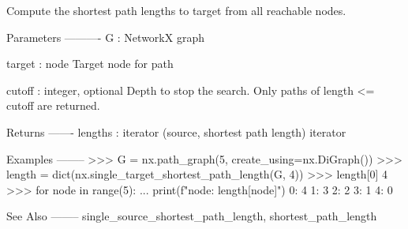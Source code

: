 \begin{DoxyVerb}Compute the shortest path lengths to target from all reachable nodes.

Parameters
----------
G : NetworkX graph

target : node
   Target node for path

cutoff : integer, optional
    Depth to stop the search. Only paths of length <= cutoff are returned.

Returns
-------
lengths : iterator
    (source, shortest path length) iterator

Examples
--------
>>> G = nx.path_graph(5, create_using=nx.DiGraph())
>>> length = dict(nx.single_target_shortest_path_length(G, 4))
>>> length[0]
4
>>> for node in range(5):
...     print(f"{node}: {length[node]}")
0: 4
1: 3
2: 2
3: 1
4: 0

See Also
--------
single_source_shortest_path_length, shortest_path_length
\end{DoxyVerb}
 